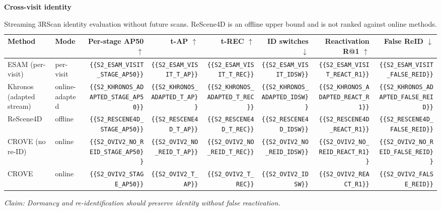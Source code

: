 \begin{table}[t]
\centering
\caption{Streaming 3RScan identity evaluation without future scans. ReScene4D is an offline upper bound and is not ranked against online methods.}
\label{tab:supp_temporal_identity}
\small
\textbf{Cross-visit identity}\\
\begin{tabular}{llrrrrrr}
\toprule
Method & Mode & Per-stage AP50 $\uparrow$ & t-AP $\uparrow$ & t-REC $\uparrow$ & ID switches $\downarrow$ & Reactivation R@1 $\uparrow$ & False ReID $\downarrow$ \\
\midrule
ESAM (per-visit) & per-visit & \verb|{{S2_ESAM_VISIT_STAGE_AP50}}| & \verb|{{S2_ESAM_VISIT_T_AP}}| & \verb|{{S2_ESAM_VISIT_T_REC}}| & \verb|{{S2_ESAM_VISIT_IDSW}}| & \verb|{{S2_ESAM_VISIT_REACT_R1}}| & \verb|{{S2_ESAM_VISIT_FALSE_REID}}| \\
Khronos (adapted stream) & online-adapted & \verb|{{S2_KHRONOS_ADAPTED_STAGE_AP50}}| & \verb|{{S2_KHRONOS_ADAPTED_T_AP}}| & \verb|{{S2_KHRONOS_ADAPTED_T_REC}}| & \verb|{{S2_KHRONOS_ADAPTED_IDSW}}| & \verb|{{S2_KHRONOS_ADAPTED_REACT_R1}}| & \verb|{{S2_KHRONOS_ADAPTED_FALSE_REID}}| \\
ReScene4D & offline & \verb|{{S2_RESCENE4D_STAGE_AP50}}| & \verb|{{S2_RESCENE4D_T_AP}}| & \verb|{{S2_RESCENE4D_T_REC}}| & \verb|{{S2_RESCENE4D_IDSW}}| & \verb|{{S2_RESCENE4D_REACT_R1}}| & \verb|{{S2_RESCENE4D_FALSE_REID}}| \\
CROVE (no re-ID) & online & \verb|{{S2_OVIV2_NO_REID_STAGE_AP50}}| & \verb|{{S2_OVIV2_NO_REID_T_AP}}| & \verb|{{S2_OVIV2_NO_REID_T_REC}}| & \verb|{{S2_OVIV2_NO_REID_IDSW}}| & \verb|{{S2_OVIV2_NO_REID_REACT_R1}}| & \verb|{{S2_OVIV2_NO_REID_FALSE_REID}}| \\
CROVE & online & \verb|{{S2_OVIV2_STAGE_AP50}}| & \verb|{{S2_OVIV2_T_AP}}| & \verb|{{S2_OVIV2_T_REC}}| & \verb|{{S2_OVIV2_IDSW}}| & \verb|{{S2_OVIV2_REACT_R1}}| & \verb|{{S2_OVIV2_FALSE_REID}}| \\
\bottomrule
\end{tabular}
\par
\smallskip
\noindent\textit{Claim: Dormancy and re-identification should preserve identity without false reactivation.}
\end{table}

